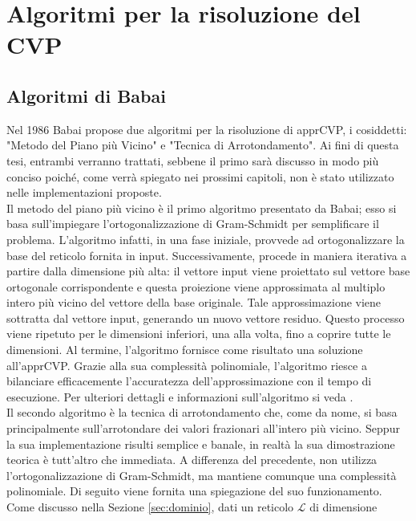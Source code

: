 \section{Algoritmi per la risoluzione del CVP}
\label{CVP}


\subsection{Algoritmi di Babai}
\label{sec:babai}
Nel 1986 Babai\cite{Babai86}  propose due algoritmi per la risoluzione di apprCVP, i cosiddetti:
"Metodo del Piano più Vicino" e "Tecnica di Arrotondamento". Ai fini di questa tesi, 
entrambi verranno trattati, sebbene il primo sarà discusso in modo più conciso 
poiché, come verrà spiegato nei prossimi capitoli, non è stato utilizzato nelle 
implementazioni proposte. \\
Il metodo del piano più vicino è il primo algoritmo presentato da Babai; esso si basa sull'impiegare 
l'ortogonalizzazione di Gram-Schmidt per semplificare il problema.
L'algoritmo infatti, in una fase iniziale, provvede ad ortogonalizzare la base del reticolo 
fornita in input.
Successivamente, procede in maniera iterativa a partire 
dalla dimensione più alta: il vettore input viene proiettato sul vettore base ortogonale 
corrispondente e questa proiezione viene approssimata al multiplo intero più vicino del 
vettore della base originale. Tale approssimazione viene sottratta dal vettore input, 
generando un nuovo vettore residuo. Questo processo viene ripetuto per le dimensioni 
inferiori, una alla volta, fino a coprire tutte le dimensioni. Al termine, l'algoritmo 
fornisce come risultato una soluzione all'apprCVP. 
Grazie alla sua complessità polinomiale, l'algoritmo riesce a bilanciare efficacemente 
l'accuratezza dell'approssimazione con il tempo di esecuzione. Per ulteriori dettagli e 
informazioni sull'algoritmo si veda \cite{Galbraith18}. 
\\
Il secondo algoritmo è la tecnica di arrotondamento che, come da nome, si basa
principalmente sull'arrotondare dei valori frazionari all'intero più vicino.
Seppur la sua implementazione risulti semplice e banale, in realtà la sua dimostrazione teorica
è tutt'altro che immediata. 
A differenza del precedente, 
non utilizza l'ortogonalizzazione di Gram-Schmidt, ma mantiene comunque una complessità 
polinomiale. Di seguito viene fornita una spiegazione del suo funzionamento. \\
Come discusso nella Sezione \ref{sec:dominio}, dati un reticolo $\mathcal{L}$ di dimensione
